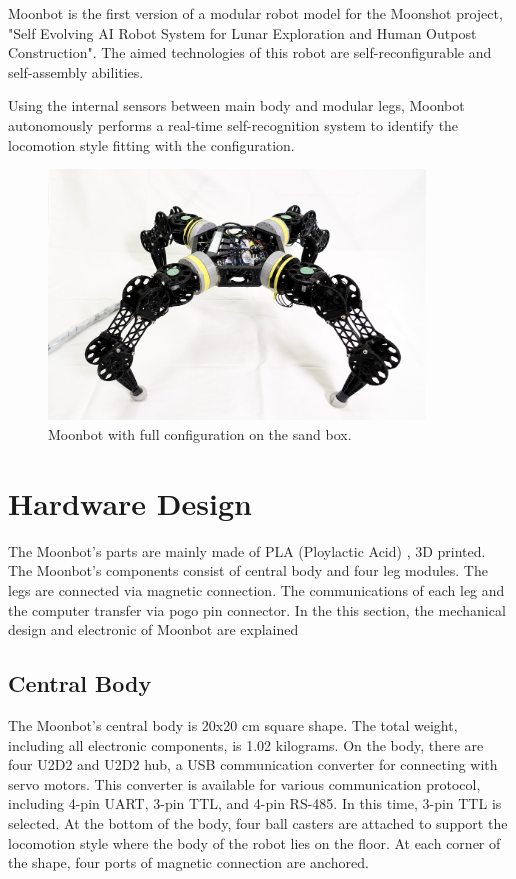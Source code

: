 Moonbot is the first version of a modular robot model for the Moonshot project, "Self Evolving AI Robot System for Lunar Exploration and Human Outpost Construction". The aimed technologies of this robot are self-reconfigurable and self-assembly abilities. 

Using the internal sensors between main body and modular legs, Moonbot autonomously performs a real-time self-recognition system to identify the locomotion style fitting with the configuration.\\

\begin{figure}[ht]
  \centering
  \includegraphics[width=100mm]{./fig/moonbot/moonbot1.jpg}
  \vspace{2mm}
  \caption{Moonbot with full configuration on the sand box.}\label{fig moonbot}
\end{figure}

\section{Hardware Design} %
The Moonbot's parts are mainly made of PLA (Ploylactic Acid) \cite{PLA}, 3D printed. The  Moonbot's components consist of central body and four leg modules. The legs are connected via magnetic connection. The communications of each leg and the computer transfer via pogo pin connector. In the this section, the mechanical design and electronic of Moonbot are explained

\subsection{Central Body}
The Moonbot's central body is 20x20 cm square shape. The total weight, including all electronic components, is 1.02 kilograms. On the body, there are four U2D2 and U2D2 hub, a USB communication converter for connecting with servo motors. This converter is available for various communication protocol, including 4-pin UART, 3-pin TTL, and 4-pin RS-485. In this time, 3-pin TTL is selected. At the bottom of the body, four ball casters are attached to support the locomotion style where the body of the robot lies on the floor. At each corner of the shape, four ports of magnetic connection are anchored.\\

